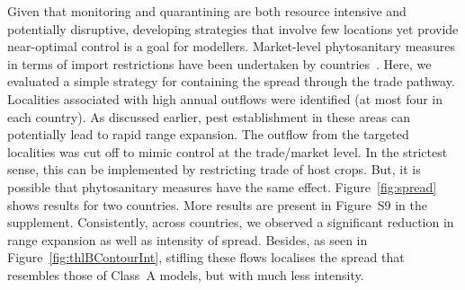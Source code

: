 \documentclass[11pt]{article}
\theoremstyle{definition}
\begin{document}
Given that monitoring and quarantining are both resource intensive and
potentially disruptive, developing strategies that involve few locations
yet provide near-optimal control is a goal for modellers.  Market-level
phytosanitary measures in terms of import restrictions have been undertaken
by countries~\cite{USDA2012}. Here, we evaluated a simple strategy for
containing the spread through the trade pathway. Localities associated with
high annual outflows were identified (at most four in each country). As
discussed earlier, pest establishment in these areas can potentially lead
to rapid range expansion. The outflow from the targeted localities was cut
off to mimic control at the trade/market level. In the strictest sense,
this can be implemented by restricting trade of host crops. But, it is
possible that phytosanitary measures have the same effect.
Figure~\ref{fig:spread} shows results for two countries.  More results are
present in Figure~S9 in the supplement.  Consistently,
across countries, we observed a significant reduction in range expansion as
well as intensity of spread.  Besides, as seen in
Figure~\ref{fig:thlBContourInt}, stifling these flows localises the spread
that resembles those of Class~A models, but with much less intensity.
\end{document}
